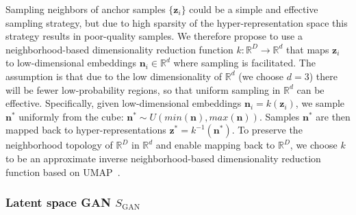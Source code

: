 \documentclass{article}
\begin{document}
Sampling neighbors of anchor samples $\{\mathbf{z}_i\}$ could be a simple and effective sampling strategy, but due to high sparsity of the hyper-representation space this strategy results in poor-quality samples. We therefore propose to use a neighborhood-based dimensionality reduction function $k: \mathbb{R}^D \to \mathbb{R}^{d}$ that maps $\mathbf{z}_i$ to low-dimensional embeddings $\mathbf{n}_i \in \mathbb{R}^{d}$ where sampling is facilitated. %
The assumption is that due to the low dimensionality of $\mathbb{R}^{d}$ (we choose $d=3$) there will be fewer low-probability regions, so that uniform sampling in $\mathbb{R}^{d}$ can be effective.
Specifically, given low-dimensional embeddings $\mathbf{n}_i = k(\mathbf{z}_i)$, we sample $\mathbf{n}^*$ uniformly from the cube: $\mathbf{n}^* \sim U({min(\mathbf{n}),max(\mathbf{n})})$.
Samples $\mathbf{n}^*$ are then mapped back to hyper-representations $ \mathbf{z}^* = k^{-1}(\mathbf{n}^*)$. 
To preserve the neighborhood topology of $\mathbb{R}^D$ in $\mathbb{R}^d$ and enable mapping back to $\mathbb{R}^D$, we choose $k$ to be an approximate inverse neighborhood-based dimensionality reduction function based on UMAP~\citep{mcinnesUMAPUniformManifold2018a}.
\\
%
\vspace{-10pt}
\subsubsection{Latent space GAN $S_{\text{GAN}}$}\label{sec:gan}
\vspace{-3pt}
\end{document}
